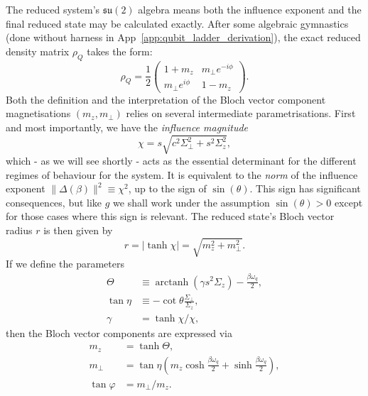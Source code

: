 The reduced system's $\mathfrak{su}(2)$ algebra means both the influence exponent and the final reduced state may be calculated exactly. After some algebraic gymnastics (done without harness in App~\ref{app:qubit_ladder_derivation}), the exact reduced density matrix $\rho_Q$ takes the form:
\begin{equation}
    \rho_Q = \frac{1}{2} \begin{pmatrix} 
        1 + m_z & m_\perp e^{-i\phi} \\
        m_\perp e^{i\phi} & 1 - m_z
    \end{pmatrix}.
    \label{eq:rho_matrix_general}
\end{equation}
Both the definition and the interpretation of the Bloch vector component magnetisations $(m_z, m_\perp)$ relies on several intermediate parametrisations. First and most importantly, we have the \emph{influence magnitude}
\begin{equation}
    \chi = s \sqrt{c^2 \Sigma_\perp^2 + s^2 \Sigma_z^2},
    \label{eq:chi_factored}
\end{equation}
which - as we will see shortly - acts as the essential determinant for the different regimes of behaviour for the system. It is equivalent to the \emph{norm} of the influence exponent $\|\Delta(\beta)\|^2 \equiv \chi^2$, up to the sign of $\sin(\theta)$. This sign has significant consequences, but like $g$ we shall work under the assumption $\sin(\theta)>0$ except for those cases where this sign is relevant. The reduced state's Bloch vector radius $r$ is then given by 
\begin{equation}
r = \left|\tanh\chi\right| =\sqrt{m_z^2+m_\perp^2}.
\end{equation}
If we define the parameters
\begin{align}
    \Theta &\equiv \operatorname{arctanh}(\gamma s^2 \Sigma_z) - \frac{\beta\omega_q}{2}, \label{eq:theta_param} \\
    \tan\eta &\equiv - \cot\theta \frac{\Sigma_\perp}{\Sigma_z}, \label{eq:eta_param} \\
    \gamma &= \tanh\chi / \chi, \label{eq:gamma_param}
\end{align}
then the Bloch vector components are expressed via
\begin{align}
    m_z &= \tanh\Theta, \label{eq:m_z_solution} \\
    m_\perp &= \tan\eta \left( m_z \cosh\frac{\beta\omega_q}{2} + \sinh\frac{\beta\omega_q}{2} \right), \label{eq:bloch_locking_linear} \\
    \tan\varphi &= m_\perp / m_z. \label{eq:tilt_angle_def}
\end{align}
